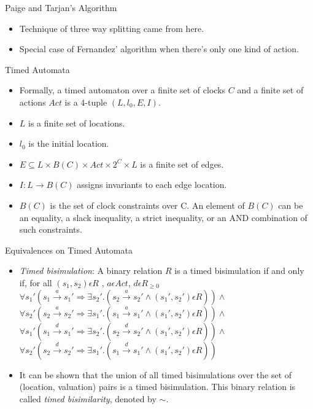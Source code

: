 \documentclass{beamer}
\begin{document}
\begin{frame}{Paige and Tarjan's Algorithm}
  \begin{itemize}
  \item Technique of three way splitting came from here.
  \item Special case of Fernandez' algorithm when there's only one
    kind of action.
  \end{itemize}
\end{frame}

\begin{frame}{Timed Automata}
  \begin{itemize}
  \item Formally, a timed automaton over a finite set of clocks $C$
    and a finite set of actions $Act$ is a 4-tuple $(L, l_{0}, E, I)$.
  \item $L$ is a finite set of locations.
  \item $l_{0}$ is the initial location.
  \item $E \subseteq L \times B(C) \times Act \times 2^{C} \times L$
    is a finite set of edges.
  \item $I: L \rightarrow B(C)$ assigns invariants to each edge
    location.
  \item $B(C)$ is the set of clock constraints over C. An element of $B(C)$
    can be an equality, a slack inequality, a strict inequality, or
    an AND combination of such constraints.
  \end{itemize}
\end{frame}

\begin{frame}{Equivalences on Timed Automata}

  \begin{itemize}
  \item \emph{Timed bisimulation}: A binary relation $R$ is a timed
    bisimulation if and only if, for all $(s_1, s_2) \epsilon R$ , $a \epsilon Act $, $d \epsilon R_{\ge 0}$\\
    $\forall s_1' (s_1 \xrightarrow{a} s_1' \Rightarrow \exists s_2'
    . (s_2 \xrightarrow{a} s_2' \wedge (s_1', s_2') \epsilon R ) )
    \wedge $ \\
    $\forall s_2' (s_2 \xrightarrow{a} s_2' \Rightarrow \exists s_1'
    . (s_1 \xrightarrow{a} s_1' \wedge (s_1', s_2') \epsilon R ) ) \wedge $ \\
    $\forall s_1' (s_1 \xrightarrow{d} s_1' \Rightarrow \exists s_2'
    . (s_2 \xrightarrow{d} s_2' \wedge (s_1', s_2') \epsilon R ) )
    \wedge $ \\
    $\forall s_2' (s_2 \xrightarrow{d} s_2' \Rightarrow \exists s_1'
    . (s_1 \xrightarrow{d} s_1' \wedge (s_1', s_2') \epsilon R ) ) $ \\

  \item It can be shown that the union of all timed bisimulations
    over the set of (location, valuation) pairs is a timed bisimulation. This binary
    relation is called \textit{timed bisimilarity}, denoted by $\sim$.
  \end{itemize}

\end{frame}
\end{document}
